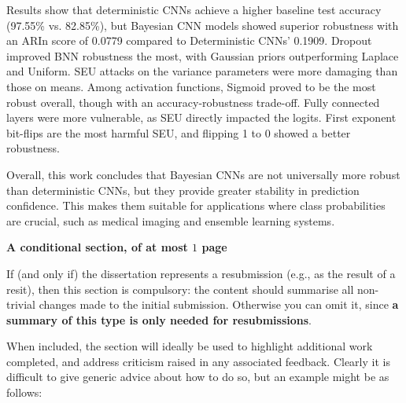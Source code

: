 \documentclass[ %
                    author={Revalda Putawara},
                supervisor={Dr. James Pope},
                    degree={MSc},
                     title={Robustness of Bayesian Neural Networks Design Choices Against Weight and Bias Perturbation Induced by Single Event Upsets (SEUs)},
                      type={},
                      year={2025}]{dissertation}
\begin{document}
Results show that deterministic CNNs achieve a higher baseline test accuracy (97.55\% vs. 82.85\%), but Bayesian CNN models showed superior robustness with an ARIn score of 0.0779 compared to Deterministic CNNs' 0.1909. Dropout improved BNN robustness the most, with Gaussian priors outperforming Laplace and Uniform. SEU attacks on the variance parameters were more damaging than those on means. Among activation functions, Sigmoid proved to be the most robust overall, though with an accuracy-robustness trade-off. Fully connected layers were more vulnerable, as SEU directly impacted the logits. First exponent bit-flips are the most harmful SEU, and flipping 1 to 0 showed a better robustness.

Overall, this work concludes that Bayesian CNNs are not universally more robust than deterministic CNNs, but they provide greater stability in prediction confidence. This makes them suitable for applications where class probabilities are crucial, such as medical imaging and ensemble learning systems.






\iffalse
{\bf A conditional section, of at most $1$ page} 
\vspace{1cm} 

If (and only if) the dissertation represents a resubmission (e.g., as the result of
a resit), then this section is compulsory: the content should summarise all
non-trivial changes made to the initial submission.  Otherwise you can
omit it, since {\bf a summary of this type is only needed for resubmissions}.

When included, the section will ideally be used to highlight additional
work completed, and address criticism raised in any associated feedback.
Clearly it is difficult to give generic advice about how to do so, but
an example might be as follows:
\end{document}
